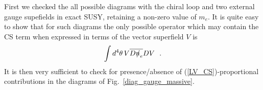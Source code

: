 \documentclass[12pt]{revtex4}
\newcommand{\slashed}[1]{\hbox{{$#1$}\llap{$/$}}}
\begin{document}
First we checked the all possible diagrams with the chiral loop and two 
  external gauge supefields in exact SUSY, retaining a non-zero value of $m_e$. 
It is quite easy to show that for such diagrams the only possible operator 
which may contain the CS term when expressed in terms
of the vector superfield $ V $ is
\begin{equation}
\label{LV_CS}
\int d^4\theta \, V \overline{D\slashed{n}_e}D V~~.
\end{equation}
        It is then very sufficient to check for presence/absence of (\ref{LV_CS})-proportional
contributions in the diagrams of Fig.~\ref{diag_gauge_massive}.
\end{document}
